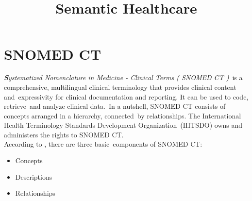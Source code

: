 \documentclass[DIV=calc, paper=a4, fontsize=12pt, onecolumn]{scrartcl}	 %
\title{Semantic Healthcare} %
\author{\authoring} %
\date{} %
\newcommand{\initial}[1]{ %
\lettrine[lines=3,lhang=0.3,nindent=0em,slope=0em]{
\color{DarkBlue}
{\textbf{\textit{#1}}}}{}}
\begin{document}
  \maketitle

  \begin{minipage}[t]{\textwidth}
    \begin{flushleft}
      \makeatletter
      \makeatother
    \end{flushleft}
  \end{minipage}

  \thispagestyle{fancy} %
  \section[Systematized Nomenclature in Medicine Clinical Terms ( SNOMED CT )]{SNOMED CT}

  \initial{S}\textit{ystematized Nomenclature in Medicine - Clinical Terms ( SNOMED CT )}\
   is a comprehensive, multilingual clinical terminology that provides clinical content and\
   expressivity for clinical documentation and reporting. It can be used to code, retrieve\
   and analyze clinical data.\
   In a nutshell, SNOMED CT consists of concepts arranged in a hierarchy, connected\
   by relationships. The International Health Terminology Standards Development Organization\
   (IHTSDO) owns and administers the rights to SNOMED CT.\\

  According to \cite{snomed_-_user_guide_snomed_2011}, there are three basic\
  components of SNOMED CT:
  \begin{itemize}
    \itemsep0em
	  \item{Concepts}
	  \item{Descriptions}
	  \item{Relationships}
  \end{itemize}
\end{document}
